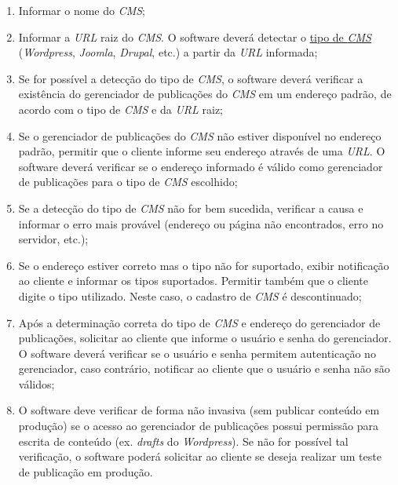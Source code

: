 \documentclass[a4paper,12pt]{article}
\def\blog{\emph{CMS}}
\def\url{\emph{URL}}
\def\tipoblog{\hyperref[tipoblog]{tipo de \blog{}}}
\begin{document}
\begin{enumerate}

\item Informar o nome do \blog{};

\item Informar a \url{} raiz do \blog{}. O software deverá detectar o \tipoblog{}
(\emph{Wordpress}, \emph{Joomla}, \emph{Drupal}, etc.) a partir da \url{}
informada;

\item Se for possível a detecção do tipo de \blog{}, o software deverá verificar
a existência do gerenciador de publicações do \blog{} em um endereço padrão, de
acordo com o tipo de \blog{} e da \url{} raiz;

\item Se o gerenciador de publicações do \blog{} não estiver disponível no
endereço padrão, permitir que o cliente informe seu endereço através de uma
\url{}. O software deverá verificar se o endereço informado é válido como
gerenciador de publicações para o tipo de \blog{} escolhido;

\item Se a detecção do tipo de \blog{} não for bem sucedida, verificar a causa e
informar o erro mais provável (endereço ou página não encontrados, erro no
servidor, etc.);

\item Se o endereço estiver correto mas o tipo não for suportado, exibir
notificação ao cliente e informar os tipos suportados. Permitir também que o
cliente digite o tipo utilizado. Neste caso, o cadastro de \blog{} é descontinuado;

\item Após a determinação correta do tipo de \blog{} e endereço do gerenciador
de publicações, solicitar ao cliente que informe o usuário e senha do
gerenciador. O software deverá verificar se o usuário e senha permitem
autenticação no gerenciador, caso contrário, notificar ao cliente que o usuário
e senha não são válidos;

\item O software deve verificar de forma não invasiva (sem publicar conteúdo em
produção) se o acesso ao gerenciador de publicações possui permissão para
escrita de conteúdo (ex. \emph{drafts} do \emph{Wordpress}). Se não for
possível tal verificação, o software poderá solicitar ao cliente se deseja
realizar um teste de publicação em produção.

\end{enumerate}
\end{document}
